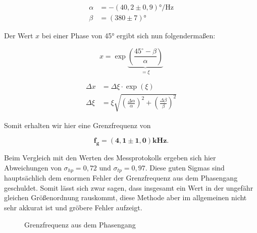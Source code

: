 \documentclass{article}
\begin{document}
\begin{equation}
    \begin{split}
        \alpha &= -(40,2 \pm 0,9) \text{°/Hz} \\
        \beta &= (380 \pm 7) \text{°}
    \end{split}
\end{equation}

Der Wert $x$ bei einer Phase von 45° ergibt sich nun folgendermaßen:

\begin{equation}
    x = \exp{\underbrace{\left( \frac{45^\circ - \beta}{\alpha} \right)}_{= \xi}}
\end{equation}

\begin{equation}
    \begin{split}
        \Delta x &= \Delta \xi \cdot \exp{(\xi)} \\
        \Delta \xi &= \xi \sqrt{\left( \frac{\Delta \alpha}{\alpha} \right)^2 + \left(  \frac{\Delta \beta}{\beta}  \right)^2}
    \end{split}
\end{equation}

Somit erhalten wir hier eine Grenzfrequenz von 

\begin{equation}
    \bm{f_g = (4,1 \pm 1,0)} \textbf{kHz}.
\end{equation}

Beim Vergleich mit den Werten des Messprotokolls ergeben sich hier Abweichungen von $\sigma_{hp} = 0,72$ und $\sigma_{tp} = 0,97$. Diese guten Sigmas sind hauptsächlich dem enormen Fehler der Grenzfrequenz aus dem Phasengang geschuldet. Somit lässt sich zwar sagen, dass insgesamt ein Wert in der ungefähr gleichen Größenordnung rauskommt, diese Methode aber im allgemeinen nicht sehr akkurat ist und gröbere Fehler aufzeigt.

\begin{figure}[!h]
    \centering
    \caption{Grenzfrequenz aus dem Phasengang}
    \label{fig:A3-Grenzfrequenz_aus_Phasengang}
\end{figure}
\end{document}
